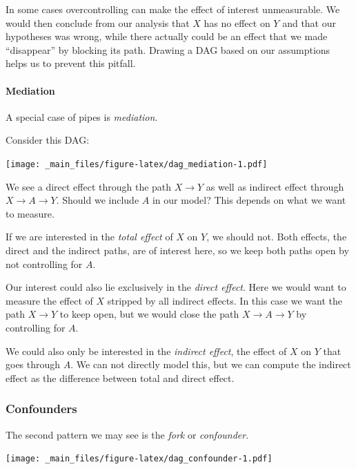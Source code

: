 \documentclass[
]{book}
\begin{document}
In some cases overcontrolling can make the effect of interest
unmeasurable. We would then conclude from our analysis that \(X\) has no
effect on \(Y\) and that our hypotheses was wrong, while there actually
could be an effect that we made ``disappear'' by blocking its path.
Drawing a DAG based on our assumptions helps us to prevent this pitfall.

\hypertarget{mediation}{%
\paragraph{Mediation}\label{mediation}}

A special case of pipes is \emph{mediation}.

Consider this DAG:

\texttt{[image: \_main\_files/figure-latex/dag\_mediation-1.pdf]}

We see a direct effect through the path \(X \rightarrow Y\) as well as
indirect effect through \(X \rightarrow A \rightarrow Y\). Should we
include \(A\) in our model? This depends on what we want to measure.

If we are interested in the \emph{total effect} of \(X\) on \(Y\), we should not.
Both effects, the direct and the indirect paths, are of interest here,
so we keep both paths open by not controlling for \(A\).

Our interest could also lie exclusively in the \emph{direct effect}. Here we
would want to measure the effect of \(X\) stripped by all indirect
effects. In this case we want the path \(X \rightarrow Y\) to keep open,
but we would close the path \(X \rightarrow A \rightarrow Y\) by
controlling for \(A\).

We could also only be interested in the \emph{indirect effect}, the effect of
\(X\) on \(Y\) that goes through \(A\). We can not directly model this, but we
can compute the indirect effect as the difference between total and
direct effect.

\hypertarget{confounders}{%
\subsubsection{Confounders}\label{confounders}}

The second pattern we may see is the \emph{fork} or \emph{confounder}.

\texttt{[image: \_main\_files/figure-latex/dag\_confounder-1.pdf]}
\end{document}
